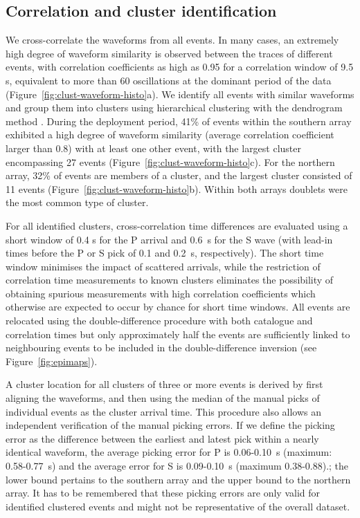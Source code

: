 \documentclass[reviewcopy]{elsarticle}
\begin{document}
\subsection{Correlation and cluster identification}

We cross-correlate the waveforms from all events.  In many cases, an
extremely high degree of waveform similarity is observed between the traces of
different events, with correlation coefficients
as high as 0.95 for a correlation window of 9.5 s, equivalent to more
than 60 oscillations at the dominant period of the data (Figure~\ref{fig:clust-waveform-histo}a).
We identify
all events with similar waveforms and group them into clusters using
hierarchical clustering with the dendrogram method \citep{hartigan75}.  During the deployment
period, 41\% of events within the southern array exhibited a high
degree of waveform similarity (average correlation coefficient larger
than 0.8) with at least one other event, with the
largest cluster encompassing 27 events (Figure~\ref{fig:clust-waveform-histo}c). For the northern array,  32\%
of events are members of a cluster, and the largest cluster consisted
of 11 events (Figure~\ref{fig:clust-waveform-histo}b).   Within
both arrays doublets were the most common type of cluster.

For all identified clusters, cross-correlation time
differences are evaluated using a short window of 0.4 s for the P
arrival and 0.6~s for the S wave (with lead-in times before the P or S
pick of 0.1 and 0.2~s, respectively). The short time window minimises
the impact of scattered arrivals, while the restriction of correlation
time measurements to known clusters eliminates the possibility of
obtaining spurious measurements with high correlation coefficients
which otherwise are expected to occur by chance for short time windows.
All events are relocated using the double-difference procedure with
both catalogue and correlation times but only approximately half the
events are sufficiently linked to neighbouring events to be included
in the double-difference inversion (see Figure~\ref{fig:epimaps}).

A cluster location for all clusters of three or more events is derived
by first aligning the waveforms, and then using the median of the
manual picks of individual events as the cluster arrival time.  This
procedure also allows an independent verification of the manual
picking errors.  If we define the picking error as the difference
between the earliest and latest pick within a nearly identical
waveform, the average picking error for P is 0.06-0.10~s (maximum: 0.58-0.77~s)
and the average error for S is 0.09-0.10~s (maximum 0.38-0.88).; the
lower bound pertains to the southern array and the upper bound to the
northern array.
 It has to be remembered that these picking errors are only valid for
 identified clustered events and might not be representative of the
 overall dataset.
\end{document}
